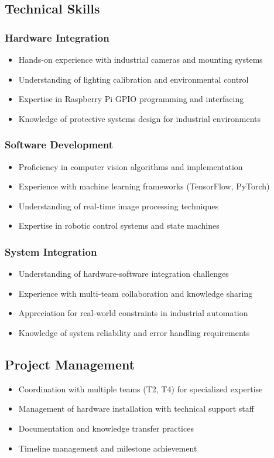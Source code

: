 \documentclass[12pt]{article}
\begin{document}
\subsection{Technical Skills}
\subsubsection{Hardware Integration}
\begin{itemize}
\item Hands-on experience with industrial cameras and mounting systems
\item Understanding of lighting calibration and environmental control
\item Expertise in Raspberry Pi GPIO programming and interfacing
\item Knowledge of protective systems design for industrial environments
\end{itemize}

\subsubsection{Software Development}
\begin{itemize}
\item Proficiency in computer vision algorithms and implementation
\item Experience with machine learning frameworks (TensorFlow, PyTorch)
\item Understanding of real-time image processing techniques
\item Expertise in robotic control systems and state machines
\end{itemize}

\subsubsection{System Integration}
\begin{itemize}
\item Understanding of hardware-software integration challenges
\item Experience with multi-team collaboration and knowledge sharing
\item Appreciation for real-world constraints in industrial automation
\item Knowledge of system reliability and error handling requirements
\end{itemize}

\subsection{Project Management}
\begin{itemize}
\item Coordination with multiple teams (T2, T4) for specialized expertise
\item Management of hardware installation with technical support staff
\item Documentation and knowledge transfer practices
\item Timeline management and milestone achievement
\end{itemize}
\end{document}
